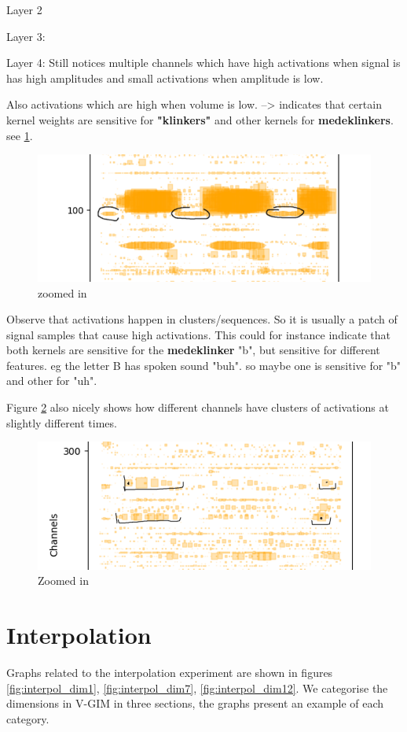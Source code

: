 \begin{appendices}
	Layer 2
	
	Layer 3:
	
	Layer 4:
	Still notices multiple channels which have high activations when signal is has high amplitudes and small activations when amplitude is low. 
	
	Also activations which are high when volume is low. --> indicates that certain kernel weights are sensitive for \textbf{"klinkers"} and other kernels for \textbf{medeklinkers}. see \ref{fig:screenshot008}.
	
	\begin{figure}[h]
		\centering
		\includegraphics[width=0.7\linewidth]{screenshot008}
		\caption{zoomed in}
		\label{fig:screenshot008}
	\end{figure}
	
	
	Observe that activations happen in clusters/sequences. So it is usually a patch of signal samples that cause high activations. This could for instance indicate that both kernels are sensitive for the \textbf{medeklinker} "b", but sensitive for different features. eg the letter B has spoken sound "buh". so maybe one is sensitive for "b" and other for "uh".
	
	Figure \ref{fig:layer4 zoomed in} also nicely shows how different channels have clusters of activations at slightly different times. 
	
	\begin{figure}[h]
		\centering
		\includegraphics[width=0.7\linewidth]{screenshot010}
		\caption{Zoomed in}
		\label{fig:layer4 zoomed in}
	\end{figure}
	
	
	\chapter{Interpolation} \label{cha:appendix_interpol}
	Graphs related to the interpolation experiment are shown in figures \ref{fig:interpol_dim1}, \ref{fig:interpol_dim7}, \ref{fig:interpol_dim12}. We categorise the dimensions in V-GIM in three sections, the graphs present an example of each category.
	
	
	
		
	


\end{appendices}